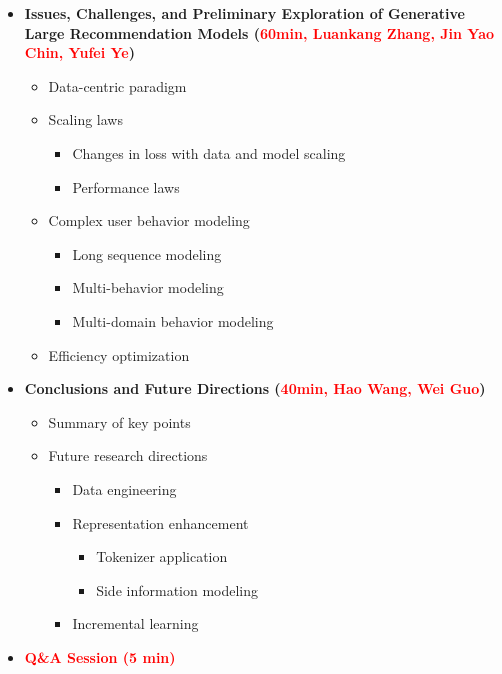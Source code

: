 \begin{itemize}[left=0pt]
    \item \textbf{Issues, Challenges, and Preliminary Exploration of Generative Large Recommendation Models (\textcolor{red}{60min, Luankang Zhang, Jin Yao Chin, Yufei Ye})}
    \begin{itemize}
        \item Data-centric paradigm~\cite{yin2024dataset,zhang2025td3,yin2024entropy}
        \item Scaling laws
        \begin{itemize}
            \item Changes in loss with data and model scaling~\cite{niu2024beyond}
            \item Performance laws~\cite{du2024understanding, niu2024beyond}
        \end{itemize}
        \item Complex user behavior modeling
        \begin{itemize}
            \item Long sequence modeling~\cite{ren2019lifelong, si2024twin, yu2024ifa}
            \item Multi-behavior modeling~\cite{wu2022multi, liu2024multi}
            \item Multi-domain behavior modeling~\cite{park2024pacer, liu2024graph}
        \end{itemize}
        \item Efficiency optimization~\cite{xu2023efficient, shao2024one, zhai2023bytetransformer, holmes2024deepspeed}
    \end{itemize}
    
    \item \textbf{Conclusions and Future Directions (\textcolor{red}{40min, Hao Wang, Wei Guo})}
    \begin{itemize}
        \item Summary of key points
        \item Future research directions
        \begin{itemize}
            \item Data engineering~\cite{lai2024survey, zhang2023sled, wang2023gradient}
            \item Representation enhancement
            \begin{itemize}
                \item Tokenizer application~\cite{hou2023learning, wang2024learnable}
                \item Side information modeling~\cite{he2023survey, liu2023user}
            \end{itemize}
            \item Incremental learning~\cite{ song2024increasing}
        \end{itemize}
    \end{itemize}
    
    \item \textbf{\textcolor{red}{Q\&A Session (5 min)}}
\end{itemize}
